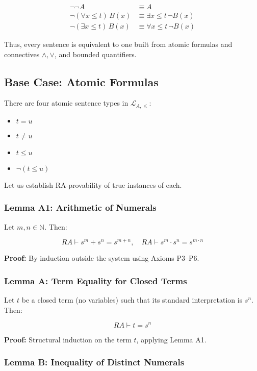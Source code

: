 \documentclass[12pt]{article}
\begin{document}
\begin{align*}
\neg \neg A &\equiv A \\
\neg (\forall x \leq t)\, B(x) &\equiv \exists x \leq t\, \neg B(x) \\
\neg (\exists x \leq t)\, B(x) &\equiv \forall x \leq t\, \neg B(x)
\end{align*}

Thus, every sentence is equivalent to one built from atomic formulas and connectives \( \wedge, \vee \), and bounded quantifiers.

\subsection{Base Case: Atomic Formulas}

There are four atomic sentence types in \( \mathcal{L}_{A,\leq} \):

\begin{itemize}
  \item \( t = u \)
  \item \( t \neq u \)
  \item \( t \leq u \)
  \item \( \neg(t \leq u) \)
\end{itemize}

Let us establish RA-provability of true instances of each.

\subsubsection*{Lemma A1: Arithmetic of Numerals}

Let \( m,n \in \mathbb{N} \). Then:

\[
RA \vdash s^m + s^n = s^{m+n}, \quad RA \vdash s^m \cdot s^n = s^{m \cdot n}
\]

\textbf{Proof:} By induction outside the system using Axioms P3–P6.

\subsubsection*{Lemma A: Term Equality for Closed Terms}

Let \( t \) be a closed term (no variables) such that its standard interpretation is \( s^n \). Then:

\[
RA \vdash t = s^n
\]

\textbf{Proof:} Structural induction on the term \( t \), applying Lemma A1.

\subsubsection*{Lemma B: Inequality of Distinct Numerals}
\end{document}
